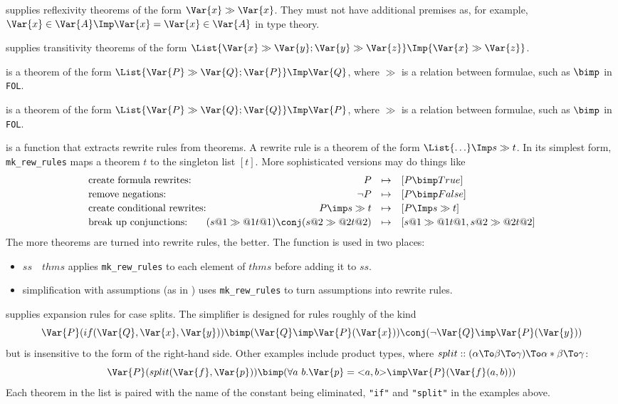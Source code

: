 \begin{ttdescription}
\item[\ttindexbold{refl_thms}] 
supplies reflexivity theorems of the form $\Var{x} \gg
\Var{x}$.  They must not have additional premises as, for example,
$\Var{x}\in\Var{A} \Imp \Var{x} = \Var{x}\in\Var{A}$ in type theory.

\item[\ttindexbold{trans_thms}] 
supplies transitivity theorems of the form
$\List{\Var{x}\gg\Var{y}; \Var{y}\gg\Var{z}} \Imp {\Var{x}\gg\Var{z}}$.

\item[\ttindexbold{red1}] 
is a theorem of the form $\List{\Var{P}\gg\Var{Q};
\Var{P}} \Imp \Var{Q}$, where $\gg$ is a relation between formulae, such as
$\bimp$ in {\tt FOL}.

\item[\ttindexbold{red2}] 
is a theorem of the form $\List{\Var{P}\gg\Var{Q};
\Var{Q}} \Imp \Var{P}$, where $\gg$ is a relation between formulae, such as
$\bimp$ in {\tt FOL}.

\item[\ttindexbold{mk_rew_rules}] 
is a function that extracts rewrite rules from theorems.  A rewrite rule is
a theorem of the form $\List{\ldots}\Imp s \gg t$.  In its simplest form,
{\tt mk_rew_rules} maps a theorem $t$ to the singleton list $[t]$.  More
sophisticated versions may do things like
\[
\begin{array}{l@{}r@{\quad\mapsto\quad}l}
\mbox{create formula rewrites:}& P & [P \bimp True] \\[.5ex]
\mbox{remove negations:}& \lnot P & [P \bimp False] \\[.5ex]
\mbox{create conditional rewrites:}& P\imp s\gg t & [P\Imp s\gg t] \\[.5ex]
\mbox{break up conjunctions:}& 
        (s@1 \gg@1 t@1) \conj (s@2 \gg@2 t@2) & [s@1 \gg@1 t@1, s@2 \gg@2 t@2]
\end{array}
\]
The more theorems are turned into rewrite rules, the better.  The function
is used in two places:
\begin{itemize}
\item 
$ss$~~$thms$ applies {\tt mk_rew_rules} to each element of
$thms$ before adding it to $ss$.
\item 
simplification with assumptions (as in ) uses
{\tt mk_rew_rules} to turn assumptions into rewrite rules.
\end{itemize}

\item[\ttindexbold{case_splits}] 
supplies expansion rules for case splits.  The simplifier is designed
for rules roughly of the kind
\[ \Var{P}(if(\Var{Q},\Var{x},\Var{y})) \bimp (\Var{Q} \imp \Var{P}(\Var{x}))
\conj (\lnot\Var{Q} \imp \Var{P}(\Var{y})) 
\] 
but is insensitive to the form of the right-hand side.  Other examples
include product types, where $split ::
(\alpha\To\beta\To\gamma)\To\alpha*\beta\To\gamma$:
\[ \Var{P}(split(\Var{f},\Var{p})) \bimp (\forall a~b. \Var{p} =
{<}a,b{>} \imp \Var{P}(\Var{f}(a,b))) 
\] 
Each theorem in the list is paired with the name of the constant being
eliminated, {\tt"if"} and {\tt"split"} in the examples above.


\end{ttdescription}
